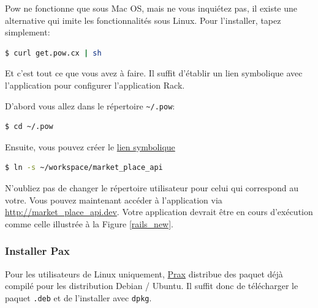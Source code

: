 \documentclass[]{report}
\begin{document}
        Pow ne fonctionne que sous Mac OS, mais ne vous inquiétez pas, il existe une alternative qui imite les fonctionnalités sous Linux. Pour l'installer, tapez simplement:

        \begin{scriptsize}
        \begin{lstlisting}[language=bash]
        $ curl get.pow.cx | sh
        \end{lstlisting}
        \end{scriptsize}

        Et c'est tout ce que vous avez à faire. Il suffit d'établir un lien symbolique avec l'application pour configurer l'application Rack.

        D'abord vous allez dans le répertoire \verb|~/.pow|:

        \begin{scriptsize}
        \begin{lstlisting}[language=bash]
        $ cd ~/.pow
        \end{lstlisting}
        \end{scriptsize}

        Ensuite, vous pouvez créer le \href{http://en.wikipedia.org/wiki/Symbolic_link}{lien symbolique}

        \begin{scriptsize}
        \begin{lstlisting}[language=bash]
        $ ln -s ~/workspace/market_place_api
        \end{lstlisting}
        \end{scriptsize}

        N'oubliez pas de changer le répertoire utilisateur pour celui qui correspond au votre. Vous pouvez maintenant accéder à l'application via \href{http://market_place_api.dev/}{http://market\_place\_api.dev}. Votre application devrait être en cours d'exécution comme celle illustrée à la Figure \ref{rails_new}.

      \subsubsection{Installer Pax}

        Pour les utilisateurs de Linux uniquement, \href{https://github.com/ysbaddaden/prax.cr}{Prax} distribue des paquet déjà compilé pour les distribution Debian / Ubuntu. Il suffit donc de télécharger le paquet \verb|.deb| et de l'installer avec \verb|dpkg|.
\end{document}
